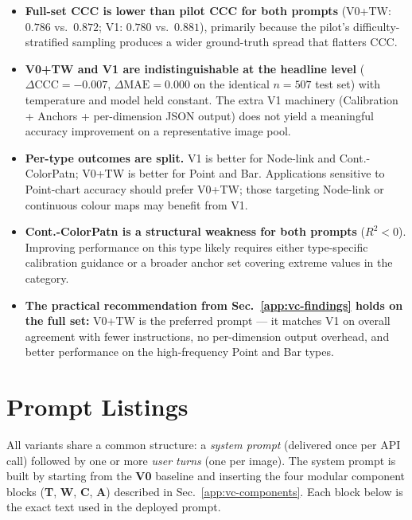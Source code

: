 \begin{itemize}
  \item \textbf{Full-set CCC is lower than pilot CCC for both prompts}
    (V0+TW: $0.786$ vs.\ $0.872$; V1: $0.780$ vs.\ $0.881$), primarily
    because the pilot's difficulty-stratified sampling produces a wider
    ground-truth spread that flatters CCC.
  \item \textbf{V0+TW and V1 are indistinguishable at the headline
    level} ($\Delta\mathrm{CCC} = -0.007$, $\Delta\mathrm{MAE} = 0.000$
    on the identical $n = 507$ test set) with temperature and model held
    constant. The extra V1 machinery (Calibration + Anchors +
    per-dimension JSON output) does not yield a meaningful accuracy
    improvement on a representative image pool.
  \item \textbf{Per-type outcomes are split.} V1 is better for Node-link
    and Cont.-ColorPatn; V0+TW is better for Point and Bar. Applications
    sensitive to Point-chart accuracy should prefer V0+TW; those
    targeting Node-link or continuous colour maps may benefit from V1.
  \item \textbf{Cont.-ColorPatn is a structural weakness for both
    prompts} ($R^2 < 0$). Improving performance on this type likely
    requires either type-specific calibration guidance or a broader
    anchor set covering extreme values in the category.
  \item \textbf{The practical recommendation from
    Sec.~\ref{app:vc-findings} holds on the full set:} V0+TW is the
    preferred prompt --- it matches V1 on overall agreement with fewer
    instructions, no per-dimension output overhead, and better
    performance on the high-frequency Point and Bar types.
\end{itemize}


\section{Prompt Listings}
\label{app:prompts}

All variants share a common structure: a \emph{system prompt} (delivered
once per API call) followed by one or more \emph{user turns} (one per
image). The system prompt is built by starting from the \textbf{V0}
baseline and inserting the four modular component blocks (\textbf{T},
\textbf{W}, \textbf{C}, \textbf{A}) described in
Sec.~\ref{app:vc-components}. Each block below is the exact text used
in the deployed prompt.

